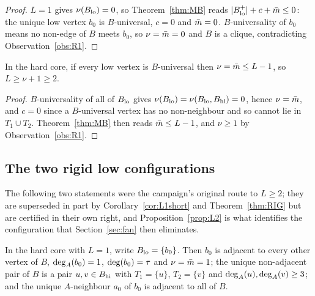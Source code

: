 \begin{proof}
$L = 1$ gives $\nu(B_{\mathrm{lo}}) = 0$, so Theorem~\ref{thm:MB} reads $|B_{\mathrm{lo}}^{+}| + c + \bar{m} \le 0$:
the unique low vertex $b_0$ is $B$-universal, $c = 0$ and $\bar{m} = 0$. $B$-universality of
$b_0$ means no non-edge of $B$ meets $b_0$, so $\nu = \bar{m} = 0$ and $B$ is a clique,
contradicting Observation~\ref{obs:R1}.
\end{proof}

\begin{corollary}[a floor on $L$]\label{cor:MB1}
In the hard core, if every low vertex is $B$-universal then $\nu = \bar{m} \le L - 1$, so
$L \ge \nu + 1 \ge 2$.
\end{corollary}

\begin{proof}
$B$-universality of all of $B_{\mathrm{lo}}$ gives $\nu(B_{\mathrm{lo}}) = \nu(B_{\mathrm{lo}},B_{\mathrm{hi}}) = 0$, hence
$\nu = \bar{m}$, and $c = 0$ since a $B$-universal vertex has no non-neighbour and so cannot
lie in $T_1 \cup T_2$. Theorem~\ref{thm:MB} then reads $\bar{m} \le L-1$, and $\nu \ge 1$ by
Observation~\ref{obs:R1}.
\end{proof}

\subsection{The two rigid low configurations}

The following two statements were the campaign's original route to $L \ge 2$; they are
superseded in part by Corollary~\ref{cor:L1short} and Theorem~\ref{thm:RIG} but are
certified in their own right, and Proposition~\ref{prop:L2} is what identifies the
configuration that Section~\ref{sec:fan} then eliminates.

\begin{proposition}[$L = 1$ is rigid]\label{prop:L1}
In the hard core with $L = 1$, write $B_{\mathrm{lo}} = \{b_0\}$. Then $b_0$ is adjacent to every
other vertex of $B$, $\mathrm{deg}_A(b_0) = 1$, $\mathrm{deg}(b_0) = \tau$ and $\nu = \bar{m} = 1$; the unique
non-adjacent pair of $B$ is a pair $u,v \in B_{\mathrm{hi}}$ with $T_1 = \{u\}$, $T_2 = \{v\}$ and
$\mathrm{deg}_A(u), \mathrm{deg}_A(v) \ge 3$; and the unique $A$-neighbour $a_0$ of $b_0$ is adjacent to all
of $B$.
\end{proposition}

